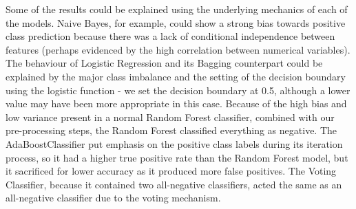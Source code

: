 \documentclass{article}
\begin{document}
Some of the results could be explained using the underlying mechanics of each of the models.
Naive Bayes, for example, could show a strong bias towards positive class prediction because there was a lack of conditional independence between features (perhaps evidenced by the high correlation between numerical variables).
The behaviour of Logistic Regression and its Bagging counterpart could be explained by the major class imbalance and the setting of the decision boundary using the logistic function - we set the decision boundary at 0.5, although a lower value may have been more appropriate in this case.
Because of the high bias and low variance present in a normal Random Forest classifier, combined with our pre-processing steps, the Random Forest classified everything as negative.
The AdaBoostClassifier put emphasis on the positive class labels during its iteration process, so it had a higher true positive rate than the Random Forest model, but it sacrificed for lower accuracy as it produced more false positives.
The Voting Classifier, because it contained two all-negative classifiers, acted the same as an all-negative classifier due to the voting mechanism.

\end{document}
